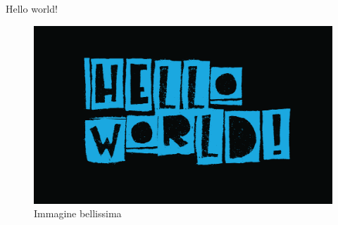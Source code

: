 Hello world!

\begin{figure}[H]
  \centering
    \includegraphics[scale=0.5]{res/img/helloWorld}
  \caption{Immagine bellissima}
  \label{fig:immagine_saluto}
\end{figure}
